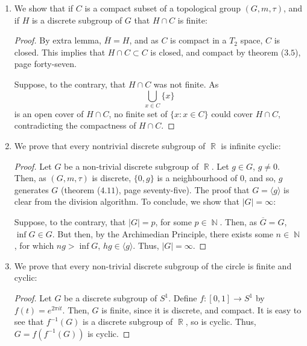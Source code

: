 \documentclass{book}
\DeclareMathOperator*{\R}{\mathbb{R}}
\DeclareMathOperator*{\N}{\mathbb{N}}
\begin{document}
\begin{enumerate}[(1)]
    \item We show that if $C$ is a compact subset of a topological group $(G, m, \tau)$, and if $H$ is a discrete subgroup of $G$ that $H \cap C$ is finite: 
        \begin{proof} By extra lemma, $\overline{H} = H$, and as $C$ is compact in a $T_2$ space, $C$ is closed. This implies that $H \cap C \subset C$ is closed, and compact by theorem ($3.5$), page forty-seven. 
            \par Suppose, to the contrary, that $H \cap C$ was not finite. As 
            \[\bigcup_{x \in C} \{x\}\]
            is an open cover of $H \cap C$, no finite set of $\{x : x \in C\}$ could cover $H \cap C$, contradicting the compactness of $H \cap C$. 
        \end{proof}

    \item We prove that every nontrivial discrete subgroup of $\R$ is infinite cyclic: 
        \begin{proof} Let $G$ be a non-trivial discrete subgroup of $\R$. Let $g \in G$, $g \neq 0$. Then, as $(G, m, \tau)$ is discrete, $\{0,g\}$ is a neighbourhood of $0$, and so, $g$ generates $G$ (theorem ($4.11$), page seventy-five). The proof that $G = \langle g \rangle$ is clear from the division algorithm. To conclude, we show that $|G| = \infty$: 
            \par Suppose, to the contrary, that $|G| = p$, for some $p \in \N$. Then, as $\overline{G} = G$, $\inf G \in G$. But then, by the Archimedian Principle, there exists some $n \in \N$, for which $ng > \inf G$, $hg \in \langle g \rangle$. Thus, $|G| = \infty$. 
        \end{proof}

    \item We prove that every non-trivial discrete subgroup of the circle is finite and cyclic: 
        \begin{proof} Let $G$ be a discrete subgroup of $S^1$. Define $f: [0,1] \rightarrow S^1$ by $f(t) = e^{2\pi i t}$. Then, $G$ is finite, since it is discrete, and compact. It is easy to see that $f^{-1}(G)$ is a discrete subgroup of $\R$, so is cyclic. Thus, $G = f(f^{-1}(G))$ is cyclic. 
        \end{proof}


\end{enumerate}
\end{document}
